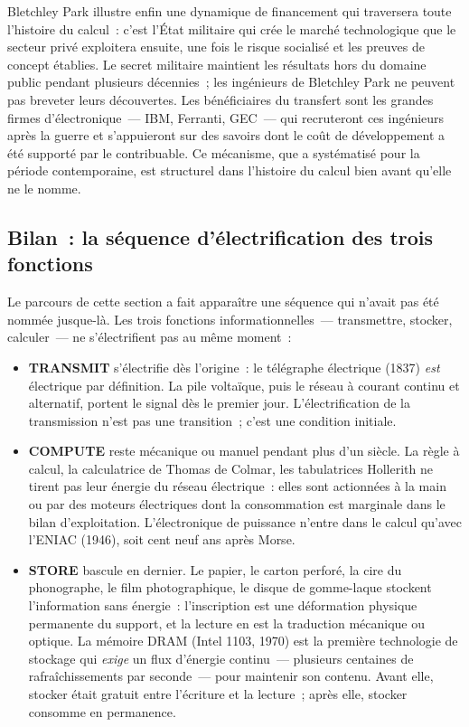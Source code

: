%
Bletchley Park illustre enfin une dynamique de financement qui traversera toute l'histoire du calcul~: c'est l'État militaire qui crée le marché technologique que le secteur privé exploitera ensuite, une fois le risque socialisé et les preuves de concept établies. Le secret militaire maintient les résultats hors du domaine public pendant plusieurs décennies~; les ingénieurs de Bletchley Park ne peuvent pas breveter leurs découvertes. Les bénéficiaires du transfert sont les grandes firmes d'électronique~--- IBM, Ferranti, GEC~--- qui recruteront ces ingénieurs après la guerre et s'appuieront sur des savoirs dont le coût de développement a été supporté par le contribuable. Ce mécanisme, que \textcite{mazzucato_entrepreneurial_2013} a systématisé pour la période contemporaine, est structurel dans l'histoire du calcul bien avant qu'elle ne le nomme.


\subsection{Bilan~: la séquence d'électrification des trois fonctions}\label{subsec:bilan_electrification}

%
Le parcours de cette section a fait apparaître une séquence qui n'avait pas été nommée jusque-là. Les trois fonctions informationnelles~--- transmettre, stocker, calculer~--- ne s'électrifient pas au même moment~:

\begin{itemize}
\item \textbf{TRANSMIT} s'électrifie dès l'origine~: le télégraphe électrique (1837) \emph{est} électrique par définition. La pile voltaïque, puis le réseau à courant continu et alternatif, portent le signal dès le premier jour. L'électrification de la transmission n'est pas une transition~; c'est une condition initiale.

\item \textbf{COMPUTE} reste mécanique ou manuel pendant plus d'un siècle. La règle à calcul, la calculatrice de Thomas de Colmar, les tabulatrices Hollerith ne tirent pas leur énergie du réseau électrique~: elles sont actionnées à la main ou par des moteurs électriques dont la consommation est marginale dans le bilan d'exploitation. L'électronique de puissance n'entre dans le calcul qu'avec l'ENIAC (1946), soit cent neuf ans après Morse.

\item \textbf{STORE} bascule en dernier. Le papier, le carton perforé, la cire du phonographe, le film photographique, le disque de gomme-laque stockent l'information sans énergie~: l'inscription est une déformation physique permanente du support, et la lecture en est la traduction mécanique ou optique. La mémoire DRAM (Intel 1103, 1970) est la première technologie de stockage qui \emph{exige} un flux d'énergie continu~--- plusieurs centaines de rafraîchissements par seconde~--- pour maintenir son contenu. Avant elle, stocker était gratuit entre l'écriture et la lecture~; après elle, stocker consomme en permanence.
\end{itemize}

